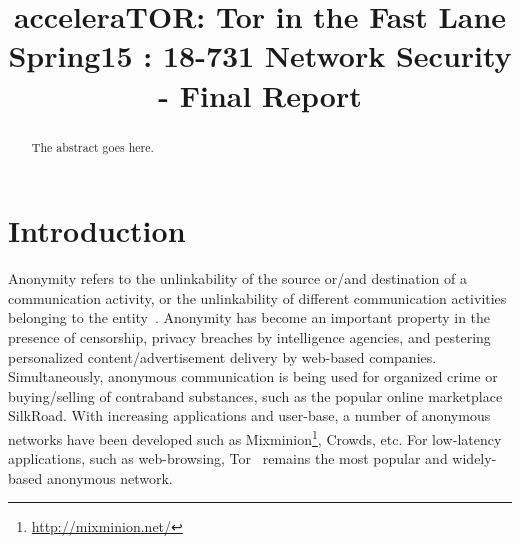 \documentclass[conference]{IEEEtran}
\begin{document}
\title{acceleraTOR: Tor in the Fast Lane\\ 
  {\Large Spring15 : 18-731 Network Security - Final Report}
}

\author{
\and
{}
\and
{}
\and
{}
}

\maketitle


%
\begin{abstract}
The abstract goes here.
\end{abstract}

% 
\section{Introduction}
\label{sec:intro}

Anonymity refers to the unlinkability of the source or\slash and destination of a communication activity, or the unlinkability of different communication activities belonging to the entity~\cite{Pfitzmann2001}. Anonymity has become an important property in the presence of censorship, privacy breaches by intelligence agencies, and pestering personalized content\slash advertisement delivery by web-based companies. Simultaneously, anonymous communication is being used for organized crime or buying\slash selling of contraband substances, such as the popular online marketplace SilkRoad. With increasing applications and user-base, a number of anonymous networks have been developed such as Mixminion\footnote{\url{http://mixminion.net/}}, Crowds\cite{Reiter:1998:CAW:290163.290168}, etc. For low-latency applications, such as web-browsing, Tor~\cite{Dingledine:2004:TSO:1251375.1251396} remains the most popular and widely-based anonymous network.
\end{document}
